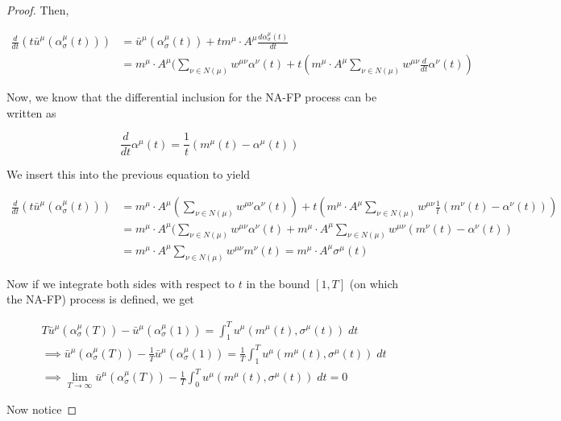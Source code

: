 \documentclass{article}
\theoremstyle{definition}
\begin{document}
\begin{proof}
		Then, 

		\begin{align}
			\frac{d}{dt} (t \bar{u}^\mu (\alpha_\sigma^\mu (t))) & =  \bar{u}^\mu (\alpha_\sigma^\mu (t)) + t m^\mu \cdot A^\mu \frac{d \alpha_\sigma^\mu (t)}{dt} \\
			& = m^\mu \cdot A^\mu (\sum_{\nu \in N(\mu)} w^{\mu \nu} \alpha^\nu (t) + t (m^\mu \cdot A^\mu \sum_{\nu \in N(\mu)} w^{\mu \nu} \frac{d}{dt} \alpha^\nu(t))
		\end{align} 

		Now, we know that the differential inclusion for the NA-FP process can be written as

		\begin{equation}
			\frac{d}{dt} \alpha^\mu (t) = \frac{1}{t} (m^\mu(t) - \alpha^\mu (t))
		\end{equation}

		We insert this into the previous equation to yield

		\begin{align}
			\frac{d}{dt} (t \bar{u}^\mu (\alpha_\sigma^\mu (t))) & = m^\mu \cdot A^\mu (\sum_{\nu \in N(\mu)} w^{\mu \nu} \alpha^\nu (t)) + t(m^\mu \cdot A^\mu \sum_{\nu \in N(\mu)} w^{\mu \nu} \frac{1}{t} (m^\nu(t) - \alpha^\nu (t))) \\
			& = m^\mu \cdot A^\mu (\sum_{\nu \in N(\mu)} w^{\mu \nu} \alpha^\nu (t) + m^\mu \cdot A^\mu \sum_{\nu \in N(\mu)} w^{\mu \nu} (m^\nu(t) - \alpha^\nu (t)) \\
			& = m^\mu \cdot A^\mu \sum_{\nu \in N(\mu)} w^{\mu \nu} m^\nu(t) = m^\mu \cdot A^\mu \sigma^\mu(t) 
		\end{align}


		Now if we integrate both sides with respect to $t$ in the bound $[1, T]$ (on which the NA-FP) process is defined, we get

		\begin{align}
			&  T \bar{u}^\mu (\alpha_\sigma^\mu (T)) - \bar{u}^\mu (\alpha_\sigma^\mu (1)) = \int_1^T u^\mu (m^\mu(t), \sigma^\mu(t)) \; dt \\
			& \implies \bar{u}^\mu (\alpha_\sigma^\mu (T)) - \frac{1}{T} \bar{u}^\mu (\alpha_\sigma^\mu (1)) = \frac{1}{T} \int_1^T u^\mu (m^\mu(t), \sigma^\mu(t)) \; dt \\
			& \implies \lim_{T \rightarrow \infty} \bar{u}^\mu (\alpha_\sigma^\mu (T)) - \frac{1}{T} \int_0^T u^\mu (m^\mu(t), \sigma^\mu(t)) \; dt = 0
		\end{align}

		Now notice


\end{proof}
\end{document}
